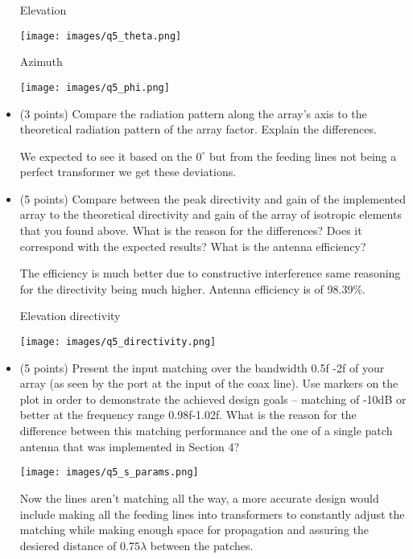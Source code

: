 \documentclass[12pt, letterpaper]{article}
\begin{document}
\begin{itemize}
  \pagebreak
  \begin{center}
    Elevation
  \end{center}
  \texttt{[image: images/q5\_theta.png]}


  \pagebreak
  \begin{center}
    Azimuth
  \end{center}
  \texttt{[image: images/q5\_phi.png]}


  \item (3 points) Compare the radiation pattern along the array's axis to the theoretical radiation pattern of the array factor. Explain the differences.

  {\color{blue}We expected to see it based on the $0^\circ$ but from the feeding lines not being a perfect transformer we get these deviations.}

  \item (5 points) Compare between the peak directivity and gain of the implemented array to the theoretical directivity and gain of the array of isotropic elements that you found above. What is the reason for the differences? Does it correspond with the expected results? What is the antenna efficiency?

  {\color{blue}The efficiency is much better due to constructive interference same reasoning for the directivity being much higher. Antenna efficiency is of 98.39\%.}

  \pagebreak
  \begin{center}
    Elevation directivity
  \end{center}
  \texttt{[image: images/q5\_directivity.png]}

  {\color{blue}}

  \item (5 points) Present the input matching over the bandwidth 0.5f -2f of your array (as seen by the port at the input of the coax line). Use markers on the plot in order to demonstrate the achieved design goals -- matching of -10dB or better at the frequency range 0.98f-1.02f. What is the reason for the difference between this matching performance and the one of a single patch antenna that was implemented in Section 4?

  \texttt{[image: images/q5\_s\_params.png]}

  {\color{blue}Now the lines aren't matching all the way, a more accurate design would include making all the feeding lines into transformers to constantly adjust the matching while making enough space for propagation and assuring the desiered distance of $0.75\lambda$ between the patches.}



\end{itemize}
\end{document}
